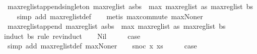 \begin{isabellebody}
\endisatagproof
{\isafoldproof}%
%
\isadelimproof
\isanewline
%
\endisadelimproof
\isanewline
{}\isamarkupfalse%
\ max{\isacharunderscore}reg{\isacharunderscore}list{\isacharunderscore}append{\isacharunderscore}singleton{\isacharcolon}\ {\isachardoublequoteopen}max{\isacharunderscore}reg{\isacharunderscore}list\ {\isacharparenleft}as{\isacharat}{\isacharbrackleft}bs{\isacharbrackright}{\isacharparenright}\ {\isacharequal}\ max\ {\isacharparenleft}max{\isacharunderscore}reg{\isacharunderscore}list\ as{\isacharparenright}\ {\isacharparenleft}max{\isacharunderscore}reg{\isacharunderscore}list\ {\isacharbrackleft}bs{\isacharbrackright}{\isacharparenright}{\isachardoublequoteclose}\isanewline
%
\isadelimproof
\ \ %
\endisadelimproof
%
\isatagproof
{}\isamarkupfalse%
\ {\isacharparenleft}simp\ add{\isacharcolon}\ max{\isacharunderscore}reg{\isacharunderscore}list{\isacharunderscore}def{\isacharparenright}\isanewline
\ \ \isamarkupfalse%
\ {\isacharparenleft}metis\ max{\isachardot}commute\ max{\isacharunderscore}None{\isacharunderscore}r{\isacharparenright}%
\endisatagproof
{\isafoldproof}%
%
\isadelimproof
\isanewline
%
\endisadelimproof
\isanewline
{}\isamarkupfalse%
\ max{\isacharunderscore}reg{\isacharunderscore}list{\isacharunderscore}append{\isacharcolon}\ {\isachardoublequoteopen}max{\isacharunderscore}reg{\isacharunderscore}list\ {\isacharparenleft}as{\isacharat}bs{\isacharparenright}\ {\isacharequal}\ max\ {\isacharparenleft}max{\isacharunderscore}reg{\isacharunderscore}list\ as{\isacharparenright}\ {\isacharparenleft}max{\isacharunderscore}reg{\isacharunderscore}list\ bs{\isacharparenright}{\isachardoublequoteclose}\isanewline
%
\isadelimproof
%
\endisadelimproof
%
\isatagproof
{}\isamarkupfalse%
{\isacharparenleft}induct\ bs\ rule{\isacharcolon}\ rev{\isacharunderscore}induct{\isacharparenright}\isanewline
\ \ \isamarkupfalse%
\ Nil\isanewline
\ \ \isamarkupfalse%
\ \isamarkupfalse%
\ {\isacharquery}case\isanewline
\ \ \ \ \isamarkupfalse%
\ {\isacharparenleft}simp\ add{\isacharcolon}\ max{\isacharunderscore}reg{\isacharunderscore}list{\isacharunderscore}def\ max{\isacharunderscore}None{\isacharunderscore}r{\isacharparenright}\isanewline
{}\isamarkupfalse%
\isanewline
\ \ \isamarkupfalse%
\ {\isacharparenleft}snoc\ x\ xs{\isacharparenright}\isanewline
\ \ \isamarkupfalse%
\ \isamarkupfalse%
\ {\isacharquery}case\isanewline
\ \ \ \ \isamarkupfalse%

\end{isabellebody}
